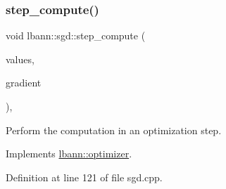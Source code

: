 \mbox{\label{classlbann_1_1sgd_a083a44b456939b58f531cea1fde2378b}} 
\subsubsection{\texorpdfstring{step\+\_\+compute()}{step\_compute()}}
{\footnotesize\ttfamily void lbann\+::sgd\+::step\+\_\+compute (\begin{DoxyParamCaption}\item[{\hyperlink{base_8hpp_a9a697a504ae84010e7439ffec862b470}{Abs\+Dist\+Mat} \&}]{values,  }\item[{const \hyperlink{base_8hpp_a9a697a504ae84010e7439ffec862b470}{Abs\+Dist\+Mat} \&}]{gradient }\end{DoxyParamCaption})\hspace{0.3cm}{\ttfamily [override]}, {\ttfamily [virtual]}}

Perform the computation in an optimization step. 

Implements \hyperlink{classlbann_1_1optimizer_a0db72c298a0bc3405fb0af97d104a036}{lbann\+::optimizer}.



Definition at line 121 of file sgd.\+cpp.



